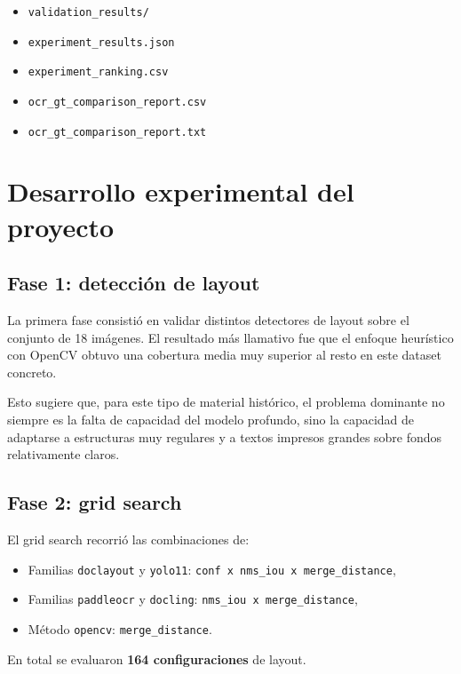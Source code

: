 \documentclass[11pt, a4paper]{article}
\begin{document}
\begin{itemize}
    \item \texttt{validation\_results/}
    \item \texttt{experiment\_results.json}
    \item \texttt{experiment\_ranking.csv}
    \item \texttt{ocr\_gt\_comparison\_report.csv}
    \item \texttt{ocr\_gt\_comparison\_report.txt}
\end{itemize}

\section{Desarrollo experimental del proyecto}

\subsection{Fase 1: detecci\'on de layout}

La primera fase consisti\'o en validar distintos detectores de layout sobre el conjunto de
18 im\'agenes. El resultado m\'as llamativo fue que el enfoque heur\'istico con OpenCV obtuvo
una cobertura media muy superior al resto en este dataset concreto.

Esto sugiere que, para este tipo de material hist\'orico, el problema dominante no siempre es
la falta de capacidad del modelo profundo, sino la capacidad de adaptarse a estructuras muy
regulares y a textos impresos grandes sobre fondos relativamente claros.

\subsection{Fase 2: grid search}

El grid search recorri\'o las combinaciones de:

\begin{itemize}
    \item Familias \texttt{doclayout} y \texttt{yolo11}: \texttt{conf x nms\_iou x merge\_distance},
    \item Familias \texttt{paddleocr} y \texttt{docling}: \texttt{nms\_iou x merge\_distance},
    \item M\'etodo \texttt{opencv}: \texttt{merge\_distance}.
\end{itemize}

En total se evaluaron \textbf{164 configuraciones} de layout.
\end{document}
